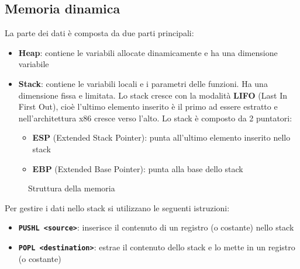\documentclass[a4paper]{article}
\theoremstyle{break}
\theoremstyle{break}
\theoremstyle{break}
\theoremstyle{break}
\begin{document}
\subsection{Memoria dinamica}
La parte dei dati è composta da due parti principali:
\begin{itemize}
	\item \textbf{Heap}: contiene le variabili allocate dinamicamente e ha una dimensione variabile
	\item \textbf{Stack}: contiene le variabili locali e i parametri delle funzioni. Ha una dimensione fissa
	      e limitata. Lo stack cresce con la modalità \textbf{LIFO} (Last In First Out), cioè l'ultimo
	      elemento inserito è il primo ad essere estratto e nell'architettura x86 cresce verso l'alto.
	      Lo stack è composto da 2 puntatori:
	      \begin{itemize}
		      \item \textbf{ESP} (Extended Stack Pointer): punta all'ultimo elemento inserito nello stack
		      \item \textbf{EBP} (Extended Base Pointer): punta alla base dello stack
	      \end{itemize}
\end{itemize}

\begin{figure}[H]
	\centering
	\caption{Struttura della memoria}
\end{figure}

\noindent Per gestire i dati nello stack si utilizzano le seguenti istruzioni:
\begin{itemize}
	\item \textbf{\texttt{PUSHL <source>}}: inserisce il contenuto di un registro (o costante) nello stack
	\item \textbf{\texttt{POPL <destination>}}: estrae il contenuto dello stack e lo mette in un registro (o costante)
\end{itemize}
\end{document}
